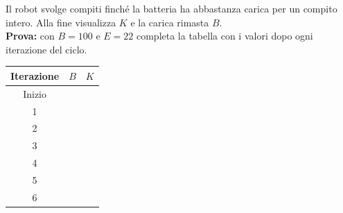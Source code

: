 \begin{esercizio}[14]
{Il robot svolge compiti finché la batteria ha abbastanza carica per un compito intero.
Alla fine visualizza $K$ e la carica rimasta $B$.\\
\textbf{Prova:} con $B = 100$ e $E = 22$ completa la tabella con i valori dopo ogni iterazione del ciclo.
\begin{center}\renewcommand{\arraystretch}{1.25}
\begin{tabular}{|c|p{3cm}|p{3cm}|}\hline
  Iterazione & $B$ & $K$\\\hline
  Inizio & &\\\hline
  1 & &\\\hline
  2 & &\\\hline
  3 & &\\\hline
  4 & &\\\hline
  5 & &\\\hline
  6 & &\\\hline
\end{tabular}\end{center}}


\end{esercizio}
